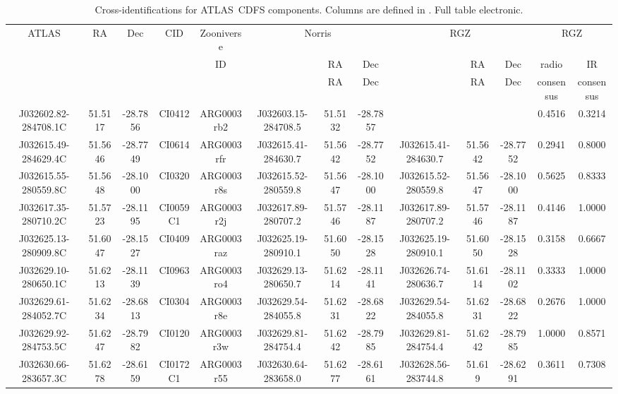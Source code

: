   \begin{table}
    \caption[Cross-identifications for ATLAS~CDFS components.]{Cross-identifications for ATLAS~CDFS components. Columns are defined in . Full table electronic.}
    \label{tab:cdfs-xids}
    \tiny\centering
    \begin{tabular}{ccccccccccccc}
      \hline\hline
ATLAS & RA & Dec & CID & Zooniverse & \multicolumn{3}{c}{Norris} & \multicolumn{3}{c}{RGZ} & \multicolumn{2}{c}{RGZ}\\
 & & & & ID & & RA & Dec & & RA & Dec & radio & IR \\
 & & & & & & RA & Dec & & RA & Dec & consensus & consensus\\
      \hline
J032602.82-284708.1C & 51.5117 & -28.7856 & CI0412 & ARG0003rb2 & J032603.15-284708.5 & 51.5132 & -28.7857 &  &  &  & 0.4516 & 0.3214 \\
J032615.49-284629.4C & 51.5646 & -28.7749 & CI0614 & ARG0003rfr & J032615.41-284630.7 & 51.5642 & -28.7752 & J032615.41-284630.7 & 51.5642 & -28.7752 & 0.2941 & 0.8000 \\
J032615.55-280559.8C & 51.5648 & -28.1000 & CI0320 & ARG0003r8s & J032615.52-280559.8 & 51.5647 & -28.1000 & J032615.52-280559.8 & 51.5647 & -28.1000 & 0.5625 & 0.8333 \\
J032617.35-280710.2C & 51.5723 & -28.1195 & CI0059C1 & ARG0003r2j & J032617.89-280707.2 & 51.5746 & -28.1187 & J032617.89-280707.2 & 51.5746 & -28.1187 & 0.4146 & 1.0000 \\
J032625.13-280909.8C & 51.6047 & -28.1527 & CI0409 & ARG0003raz & J032625.19-280910.1 & 51.6050 & -28.1528 & J032625.19-280910.1 & 51.6050 & -28.1528 & 0.3158 & 0.6667 \\
J032629.10-280650.1C & 51.6213 & -28.1139 & CI0963 & ARG0003ro4 & J032629.13-280650.7 & 51.6214 & -28.1141 & J032626.74-280636.7 & 51.6114 & -28.1102 & 0.3333 & 1.0000 \\
J032629.61-284052.7C & 51.6234 & -28.6813 & CI0304 & ARG0003r8e & J032629.54-284055.8 & 51.6231 & -28.6822 & J032629.54-284055.8 & 51.6231 & -28.6822 & 0.2676 & 1.0000 \\
J032629.92-284753.5C & 51.6247 & -28.7982 & CI0120 & ARG0003r3w & J032629.81-284754.4 & 51.6242 & -28.7985 & J032629.81-284754.4 & 51.6242 & -28.7985 & 1.0000 & 0.8571 \\
J032630.66-283657.3C & 51.6278 & -28.6159 & CI0172C1 & ARG0003r55 & J032630.64-283658.0 & 51.6277 & -28.6161 & J032628.56-283744.8 & 51.619 & -28.6291 & 0.3611 & 0.7308 \\

\end{tabular}
\end{table}
